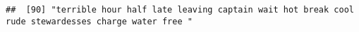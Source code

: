 \documentclass[
]{article}
\begin{document}
\begin{verbatim}
##  [90] "terrible hour half late leaving captain wait hot break cool rude stewardesses charge water free "                                                                                                                                                                                                                                                                                                                                                                                                                                                                                                                                                                                                                                                                                                                                                                                                                                                                                                                                                                                                                                                                                                                                                                                                                                                                                                                                                                                                                                                                                                                                                                                                                                                                                              

\end{verbatim}
\end{document}
